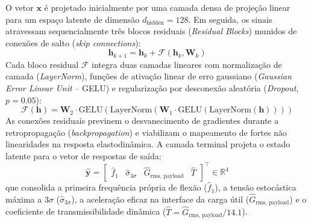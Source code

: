 O vetor $\mathbf{x}$ é projetado inicialmente por uma camada densa de projeção linear para um espaço latente de dimensão $d_{\text{hidden}} = 128$. Em seguida, os sinais atravessam sequencialmente três blocos residuais (\textit{Residual Blocks}) munidos de conexões de salto (\textit{skip connections}):
\begin{equation}
  \mathbf{h}_{k+1} = \mathbf{h}_k + \mathcal{F}(\mathbf{h}_k, \mathbf{W}_k)
  \label{eq:residual}
\end{equation}
Cada bloco residual $\mathcal{F}$ integra duas camadas lineares com normalização de camada (\textit{LayerNorm}), funções de ativação linear de erro gaussiano (\textit{Gaussian Error Linear Unit} -- GELU) e regularização por desconexão aleatória (\textit{Dropout}, $p = \num{0.05}$):
\begin{equation}
  \mathcal{F}(\mathbf{h}) = \mathbf{W}_2 \cdot \mathrm{GELU}\!\left( \mathrm{LayerNorm}\!\left( \mathbf{W}_1 \cdot \mathrm{GELU}\!\left( \mathrm{LayerNorm}(\mathbf{h}) \right) \right) \right)
  \label{eq:bloco}
\end{equation}
As conexões residuais previnem o desvanecimento de gradientes durante a retropropagação (\textit{backpropagation}) e viabilizam o mapeamento de fortes não linearidades na resposta elastodinâmica. A camada terminal projeta o estado latente para o vetor de respostas de saída:
\begin{equation}
  \hat{\mathbf{y}} = \begin{bmatrix} \hat{f}_1 & \hat{\sigma}_{3\sigma} & \hat{G}_{\text{rms, payload}} & \hat{T} \end{bmatrix}^{\top} \in \mathbb{R}^{4}
  \label{eq:saida}
\end{equation}
que consolida a primeira frequência própria de flexão ($\hat{f}_1$), a tensão estocástica máxima a $3\sigma$ ($\hat{\sigma}_{3\sigma}$), a aceleração eficaz na interface da carga útil ($\hat{G}_{\text{rms, payload}}$) e o coeficiente de transmissibilidade dinâmica ($\hat{T} = \hat{G}_{\text{rms, payload}} / \num{14.1}$).

